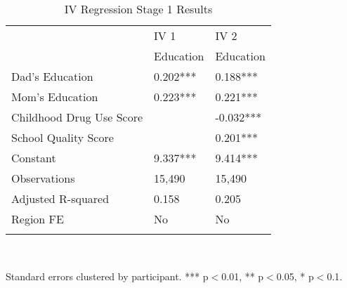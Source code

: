 \begin{table}[h] \centering
{}

\caption{IV Regression Stage 1 Results}
{\footnotesize
\begin{tabularx}{0.5\linewidth}{@{}lCC@{}}

\toprule
&IV 1&IV 2 \tabularnewline
&Education&Education \tabularnewline
\midrule Dad's Education&0.202***&0.188*** \tabularnewline
Mom's Education&0.223***&0.221*** \tabularnewline
Childhood Drug Use Score&&-0.032*** \tabularnewline
School Quality Score&&0.201*** \tabularnewline
Constant&9.337***&9.414*** \tabularnewline
\midrule Observations&15,490&15,490 \tabularnewline
Adjusted R-squared&0.158&0.205 \tabularnewline
Region FE&No&No \tabularnewline
\bottomrule \addlinespace[\belowrulesep]

\end{tabularx}
\\ \parbox{0.5\linewidth}{\footnotesize Standard errors clustered by participant. *** p$<$0.01, ** p$<$0.05, * p$<$0.1.}
}
\end{table}
